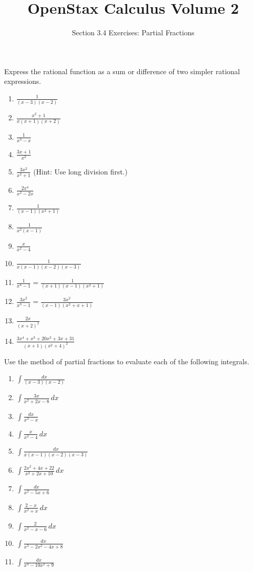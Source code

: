 \documentclass{exercises}
\title{OpenStax Calculus Volume 2}
\subtitle{Section 3.4 Exercises: Partial Fractions}
\author{}
\date{}
\begin{document}
\maketitle


Express the rational function as a sum or difference of two simpler rational expressions.

\begin{enumerate}[start=1]
\item $\frac{1}{(x-3)(x-2)}$
\item $\frac{x^{2}+1}{x(x+1)(x+2)}$
\item $\frac{1}{x^{3}-x}$
\item $\frac{3x+1}{x^{2}}$
\item $\frac{3x^{2}}{x^{2}+1}$ (Hint: Use long division first.)
\item $\frac{2x^{4}}{x^{2}-2x}$
\item $\frac{1}{(x-1)(x^{2}+1)}$
\item $\frac{1}{x^{2}(x-1)}$
\item $\frac{x}{x^{2}-4}$
\item $\frac{1}{x(x-1)(x-2)(x-3)}$
\item $\frac{1}{x^{4}-1}=\frac{1}{(x+1)(x-1)(x^{2}+1)}$
\item $\frac{3x^{2}}{x^{3}-1}=\frac{3x^{2}}{(x-1)(x^{2}+x+1)}$
\item $\frac{2x}{{(x+2)}^{2}}$
\item $\frac{3x^{4}+x^{3}+20x^{2}+3x+31}{(x+1){(x^{2}+4)}^{2}}$
\end{enumerate}

Use the method of partial fractions to evaluate each of the following integrals.

\begin{enumerate}[resume]
\item $\int \frac{dx}{(x-3)(x-2)}$
\item $\int \frac{3x}{x^{2}+2x-8}\,dx$
\item $\int \frac{dx}{x^{3}-x}$
\item $\int \frac{x}{x^{2}-4}\,dx$
\item $\int \frac{dx}{x(x-1)(x-2)(x-3)}$
\item $\int \frac{2x^{2}+4x+22}{x^{2}+2x+10}\,dx$
\item $\int \frac{dx}{x^{2}-5x+6}$
\item $\int \frac{2-x}{x^{2}+x}\,dx$
\item $\int \frac{2}{x^{2}-x-6}\,dx$
\item $\int \frac{dx}{x^{3}-2x^{2}-4x+8}$
\item $\int \frac{dx}{x^{4}-10x^{2}+9}$
\end{enumerate}
\end{document}
